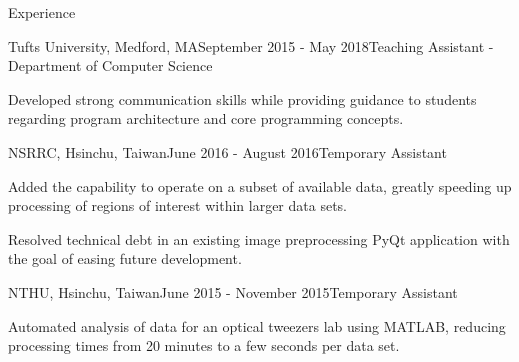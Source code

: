 \documentclass{resume} %
\begin{document}

\begin{rSection}{Experience}


\begin{rSubsection}{Tufts University, Medford, MA}{September 2015 -
    May 2018}{Teaching Assistant - Department of Computer Science}

\item Developed strong communication skills while providing guidance to
    students regarding program architecture and core programming concepts.

\end{rSubsection}

\begin{rSubsection}{NSRRC, Hsinchu, Taiwan}{June 2016 - August 2016}{Temporary
    Assistant}

\item Added the capability to operate on a subset of available data, greatly
    speeding up processing of regions of interest within larger data sets.

\item Resolved technical debt in an existing image preprocessing PyQt
    application with the goal of easing future development.

\end{rSubsection}

\begin{rSubsection}{NTHU, Hsinchu, Taiwan}{June 2015 - November
    2015}{Temporary Assistant}

\item Automated analysis of data for an optical tweezers lab using MATLAB,
    reducing processing times from 20 minutes to a few seconds per data set.

\end{rSubsection}

\bigskip

\end{rSection}
\end{document}
